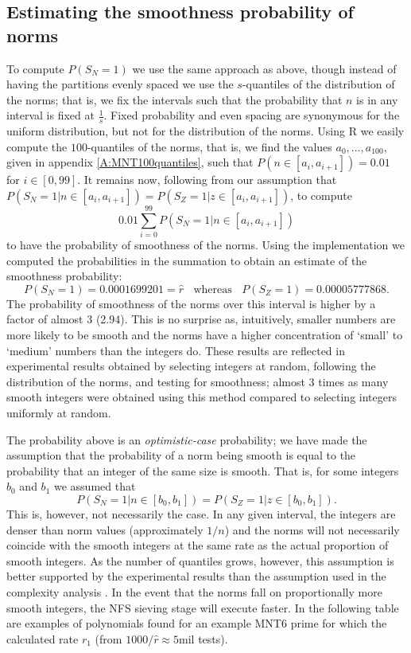 \documentclass[a4paper, 12pt, envcountsect, runningheads]{llncs}
\numberwithin{figure}{section}
\numberwithin{equation}{section}
\begin{document}
\subsection{Estimating the smoothness probability of norms}
\label{ss:smoothness}
To compute $P(S_N=1)$ we use the same approach as above, though instead of having the partitions evenly spaced we use the $s$-quantiles of the distribution of the norms; that is, we fix the intervals such that the probability that $n$ is in any interval is fixed at $\frac{1}{s}$. Fixed probability and even spacing are synonymous for the uniform distribution, but not for the distribution of the norms. Using R we easily compute the $100$-quantiles of the norms, that is, we find the values $a_0,\ldots,a_{100}$, given in appendix \ref{A:MNT100quantiles}, such that $P(n\in[a_i,a_{i+1}])=0.01$ for $i\in[0,99]$. It remains now, following from our assumption that $P(S_N=1| n\in[a_i,a_{i+1}])=P(S_Z=1| z\in[a_i,a_{i+1}])$, to compute $$0.01\sum_{i=0}^{99}P(S_N=1| n\in[a_i,a_{i+1}])$$ to have the probability of smoothness of the norms. Using the implementation \cite{dan_imp} we computed the probabilities in the summation to obtain an estimate of the smoothness probability: $$P(S_N=1)=0.0001699201=\hat{r}\;\;\mbox{ whereas }\;\;P(S_Z=1)=0.00005777868.$$
The probability of smoothness of the norms over this interval is higher by a factor of almost 3 (2.94). This is no surprise as, intuitively, smaller numbers are more likely to be smooth and the norms have a higher concentration of `small' to `medium' numbers than the integers do. These results are reflected in experimental results obtained by selecting integers at random, following the distribution of the norms, and testing for smoothness; almost 3 times as many smooth integers were obtained using this method compared to selecting integers uniformly at random.

The probability above is an {\em optimistic-case} probability; we have made the assumption that the probability of a norm being smooth is equal to the probability that an integer of the same size is smooth. That is, for some integers $b_0$ and $b_1$ we assumed that $$P(S_N=1| n\in[b_0,b_1])=P(S_Z=1| z\in[b_0,b_1]).$$ This is, however, not necessarily the case. In any given interval, the integers are denser than norm values (approximately $1/n$) and the norms will not necessarily coincide with the smooth integers at the same rate as the actual proportion of smooth integers. As the number of quantiles grows, however, this assumption is better supported by the experimental results than the assumption used in the complexity analysis \cite{joux-lercier-smart-vercauteren06}. In the event that the norms fall on proportionally more smooth integers, the NFS sieving stage will execute faster. In the following table are examples of polynomials found for an example MNT6 prime for which the calculated rate $r_1$ (from $1000/\hat{r}\approx5$mil tests).\\
\end{document}
